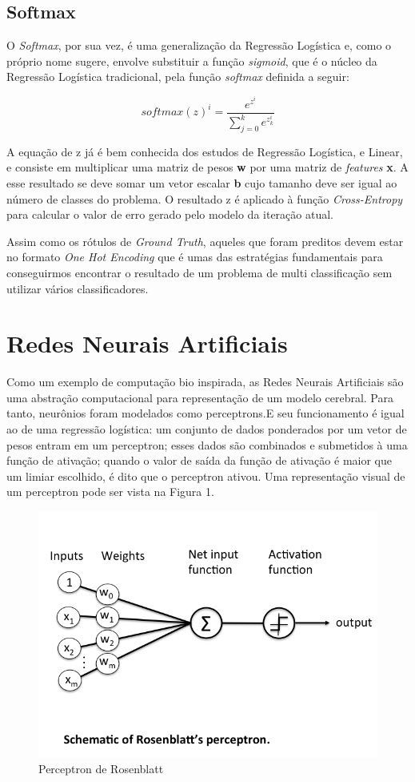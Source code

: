 \documentclass[conference]{IEEEtran}
\begin{document}
\subsection{Softmax}

O \textit{Softmax}, por sua vez, é uma generalização da Regressão Logística e, como o próprio nome sugere, envolve substituir a função \textit{sigmoid}, que é o núcleo da Regressão Logística tradicional, pela função \textit{softmax} definida a seguir:

\begin{equation*}
 \textit{softmax}(z)^i = \frac{e^{z^i}}{\sum\limits_{j=0}^k e^{z_k^i}  }
\end{equation*}

A equação de z já é bem conhecida dos estudos de Regressão Logística, e Linear, e consiste em multiplicar uma matriz de pesos \textbf{w} por uma matriz de \textit{features} \textbf{x}. A esse resultado se deve somar um vetor escalar \textbf{b} cujo tamanho deve ser igual ao número de classes do problema. O resultado z é aplicado à função \textit{Cross-Entropy} para calcular o valor de erro gerado pelo modelo da iteração atual.\par
 Assim como os rótulos de \textit{Ground Truth}, aqueles que foram preditos devem estar no formato \textit{One Hot Encoding} que é umas das estratégias fundamentais para conseguirmos encontrar o resultado de um problema de multi classificação sem utilizar vários classificadores.




\section{Redes Neurais Artificiais}

	Como um exemplo de computação bio inspirada, as Redes Neurais Artificiais são uma abstração computacional para representação de um modelo cerebral. Para tanto, neurônios foram modelados como perceptrons.E seu funcionamento é igual ao de uma regressão logística: um conjunto de dados ponderados por um vetor de pesos entram em um perceptron; esses dados são combinados e submetidos à uma função de ativação; quando o valor de saída da função de ativação é maior que um limiar escolhido, é dito que o perceptron ativou. Uma representação visual de um perceptron pode ser vista na Figura 1.
	
  
  \begin{figure}[!h]
      \centering
      \includegraphics[width=0.6\columnwidth]{images/perceptron.png}
      \caption{Perceptron de Rosenblatt}
      \label{fig1}
\end{figure}  
  
\end{document}
